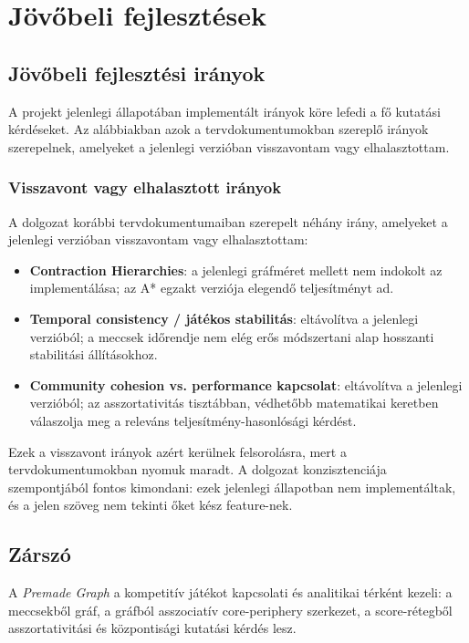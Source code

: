 \chapter{Jövőbeli fejlesztések}

\section{Jövőbeli fejlesztési irányok}

A projekt jelenlegi állapotában implementált irányok köre lefedi a fő kutatási kérdéseket. Az alábbiakban azok a tervdokumentumokban szereplő irányok szerepelnek, amelyeket a jelenlegi verzióban visszavontam vagy elhalasztottam.

\subsection{Visszavont vagy elhalasztott irányok}

A dolgozat korábbi tervdokumentumaiban szerepelt néhány irány, amelyeket a jelenlegi verzióban visszavontam vagy elhalasztottam:

\begin{itemize}
    \item \textbf{Contraction Hierarchies}: a jelenlegi gráfméret mellett nem indokolt az implementálása; az A* egzakt verziója elegendő teljesítményt ad.
    \item \textbf{Temporal consistency / játékos stabilitás}: eltávolítva a jelenlegi verzióból; a meccsek időrendje nem elég erős módszertani alap hosszanti stabilitási állításokhoz.
    \item \textbf{Community cohesion vs. performance kapcsolat}: eltávolítva a jelenlegi verzióból; az asszortativitás tisztábban, védhetőbb matematikai keretben válaszolja meg a releváns teljesítmény-hasonlósági kérdést.

\end{itemize}

Ezek a visszavont irányok azért kerülnek felsorolásra, mert a tervdokumentumokban nyomuk maradt. A dolgozat konzisztenciája szempontjából fontos kimondani: ezek jelenlegi állapotban nem implementáltak, és a jelen szöveg nem tekinti őket kész feature-nek.

\section{Zárszó}

A \emph{Premade Graph} a kompetitív játékot kapcsolati és analitikai térként kezeli: a meccsekből gráf, a gráfból asszociatív core-periphery szerkezet, a score-rétegből asszortativitási és központisági kutatási kérdés lesz.
